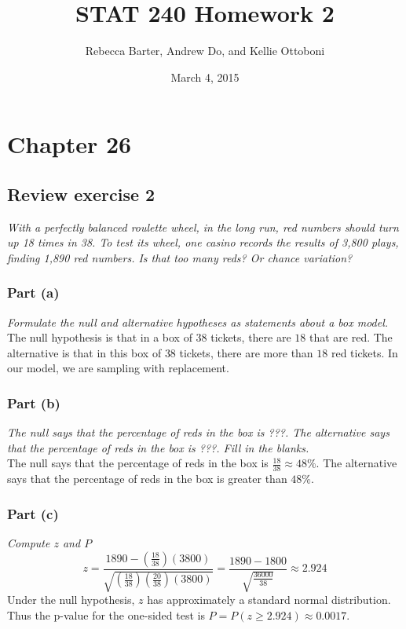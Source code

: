\documentclass[11pt]{article}
\title{STAT 240 Homework 2}
\author{Rebecca Barter, Andrew Do, and Kellie Ottoboni}
\date{March 4, 2015} %
\begin{document}
\maketitle


\section*{Chapter 26}
\subsection*{Review exercise 2} %
\noindent \emph{With a perfectly balanced roulette wheel, in the long run, red numbers should turn up 18 times in 38. To test its wheel, one casino records the results of 3,800 plays, finding 1,890 red numbers. Is that too many reds? Or chance variation?}
\subsubsection*{Part (a)}
\noindent \emph{Formulate the null and alternative hypotheses as statements about a box model.}\\

\noindent The null hypothesis is that in a box of $38$ tickets, there are $18$ that are red.  The alternative is that in this box of $38$ tickets, there are more than $18$ red tickets.  In our model, we are sampling with replacement.

\subsubsection*{Part (b)}
\noindent \emph{The null says that the percentage of reds in the box is ???. The alternative says that the percentage of reds in the box is ???. Fill in the blanks.}\\

\noindent The null says that the percentage of reds in the box is $\frac{18}{38}\approx 48\%$.  The alternative says that the percentage of reds in the box is greater than $48\%$.
\subsubsection*{Part (c)}
\noindent \emph{Compute $z$ and $P$}\\

$$z = \frac{1890 - (\frac{18}{38})(3800)}{\sqrt{ (\frac{18}{38}) (\frac{20}{38})(3800)}} = \frac{1890 - 1800}{\sqrt{\frac{36000}{38}}} \approx 2.924$$
Under the null hypothesis, $z$ has approximately a standard normal distribution.  Thus the p-value for the one-sided test is $P = P(z \geq 2.924) \approx 0.0017$.  
\end{document}
